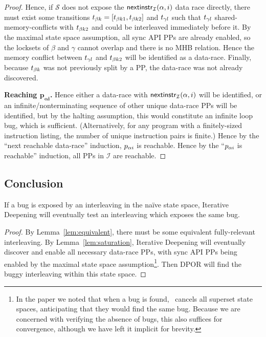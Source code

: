 \begin{proof}
Hence, if $\mathcal{S}$ does not expose the $\mathsf{nextinstr}_{\mathcal{I}}(\alpha,i)$ data race directly,
there must exist some transitions $t_{\beta{}k} = [t_{\beta{}k1},t_{\beta{}k2}]$ and $t_{\gamma{}l}$ such that $t_{\gamma{}l}$ shared-memory-conflicts with $t_{\beta{}k2}$ and could be interleaved immediately before it.
By the maximal state space assumption, all sync API PPs are already enabled, so the locksets of $\beta$ and $\gamma$ cannot overlap and there is no MHB relation.
Hence the memory conflict between $t_{\gamma{}l}$ and $t_{\beta{}k2}$ will be identified as a data-race.
Finally, because $t_{\beta{}k}$ was not previously split by a PP, the data-race was not already discovered.

{\bf Reaching $\mathbf{p_{\alpha{}i}}$.}
Hence either a data-race with $\mathsf{nextinstr}_{\mathcal{I}}(\alpha,i)$ will be identified,
or an infinite/nonterminating sequence of other unique data-race PPs will be identified,
but by the halting assumption, this would constitute an infinite loop bug, which is sufficient.
(Alternatively, for any program with a finitely-sized instruction listing, the number of unique instruction pairs is finite.)
Hence by the ``next reachable data-race'' induction, $p_{\alpha{}i}$ is reachable.
Hence by the ``$p_{\alpha{}i}$ is reachable'' induction, all PPs in $\mathcal{I}$ are reachable.
\end{proof}


\subsection{Conclusion}

\setcounter{theorem}{1}
\begin{theorem}
	If a bug is exposed by an interleaving in the na\"{i}ve state space, Iterative Deepening will eventually test an interleaving which exposes the same bug.
\end{theorem}

\begin{proof}
By Lemma~\ref{lem:equivalent}, there must be some equivalent fully-relevant interleaving.
By Lemma~\ref{lem:saturation}, Iterative Deepening will eventually discover and enable all necessary data-race PPs, with sync API PPs being enabled by the maximal state space assumption\footnote{
		In the paper we noted that when a bug is found, \quicksand~cancels all superset state spaces, anticipating that they would find the same bug.
		Because we are concerned with verifying the absence of bugs, this also suffices for convergence, although we have left it implicit for brevity.}.
Then DPOR will find the buggy interleaving within this state space.
\end{proof}
